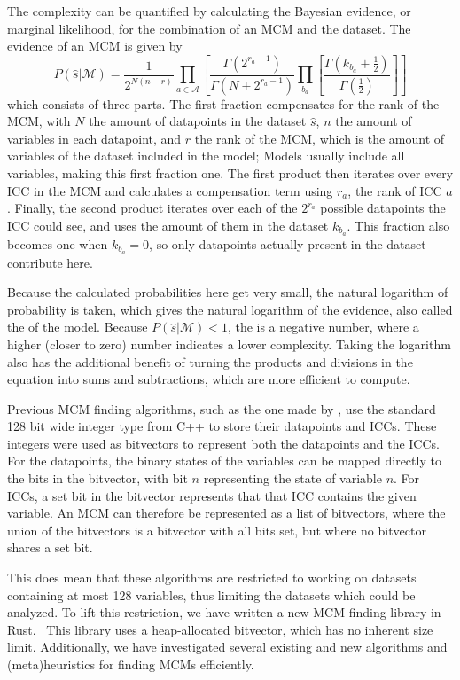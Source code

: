The complexity can be quantified by calculating the Bayesian evidence, or marginal likelihood, for the combination of an MCM and the dataset. The evidence of an MCM is given by
\begin{equation}\label{loge}
  P(\hat{s}|\mathcal{M})= \frac{1}{2^{N(n-r)}} \prod_{a \in \mathcal{A}} \left[ \frac{\Gamma(2^{r_{a} - 1})}{\Gamma(N+2^{r_{a} -1})} \prod_{b_{a} } \left[ \frac{\Gamma(k_{b_{a} }+\frac{1}{2})}{\Gamma\left( \frac{1}{2} \right)} \right] \right]
\end{equation}
which consists of three parts. The first fraction compensates for the rank of the MCM, with \(N\) the amount of datapoints in the dataset \(\hat{s}\), \(n\) the amount of variables in each datapoint, and \(r\) the rank of the MCM, which is the amount of variables of the dataset included in the model; Models usually include all variables, making this first fraction one. The first product then iterates over every ICC in the MCM and calculates a compensation term using \(r_a\), the rank of ICC \(a\). Finally, the second product iterates over each of the \(2^{r_a}\) possible datapoints the ICC could see, and uses the amount of them in the dataset \(k_{b_a}\). This fraction also becomes one when \(k_{b_a}=0\), so only datapoints actually present in the dataset contribute here.

Because the calculated probabilities here get very small, the natural logarithm of probability is taken, which gives the natural logarithm of the evidence, also called the \loge{} of the model. Because \(P(\hat{s}|\mathcal{M})<1\), the \loge{} is a negative number, where a higher (closer to zero) number indicates a lower complexity. Taking the logarithm also has the additional benefit of turning the products and divisions in the equation into sums and subtractions, which are more efficient to compute. 

Previous MCM finding algorithms, such as the one made by \citet{bayesianinference}, use the standard 128 bit wide integer type from C++ to store their datapoints and ICCs. These integers were used as bitvectors to represent both the datapoints and the ICCs. For the datapoints, the binary states of the variables can be mapped directly to the bits in the bitvector, with bit \(n\) representing the state of variable \(n\). For ICCs, a set bit in the bitvector represents that that ICC contains the given variable. An MCM can therefore be represented as a list of bitvectors, where the union of the bitvectors is a bitvector with all bits set, but where no bitvector shares a set bit.

This does mean that these algorithms are restricted to working on datasets containing at most 128 variables, thus limiting the datasets which could be analyzed. To lift this restriction, we have written a new MCM finding library in Rust.~\cite{rust} This library uses a heap-allocated bitvector, which has no inherent size limit. Additionally, we have investigated several existing and new algorithms and (meta)heuristics for finding MCMs efficiently. 
